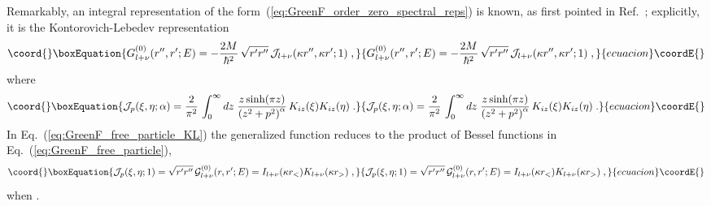 \documentclass[a4paper,preprint,draft,showpacs,amsmath,amsfonts,amssymb,aps,prd]{revtex4}%
\begin{document}
Remarkably,
an integral representation of the 
form~(\ref{eq:GreenF_order_zero_spectral_reps})
is known, as first pointed in Ref.~\cite{bha:89};
explicitly,
it is the Kontorovich-Lebedev representation~\cite{kontorovich}  
\begin{equation}\coord{}\boxEquation{
G^{(0)}_{l+\nu} (r'',r';E)    
=
 - \frac{2M}{\hbar^{2}} \,
\sqrt{ r'r''} \,
{\cal J}_{l+\nu} (\kappa r'',\kappa r';1)
\;   ,
\label{eq:GreenF_free_particle_KL}
}{
G^{(0)}_{l+\nu} (r'',r';E)    
=
 - \frac{2M}{\hbar^{2}} \,
\sqrt{ r'r''} \,
{\cal J}_{l+\nu} (\kappa r'',\kappa r';1)
\;   ,
}{ecuacion}\coordE{}\end{equation}
where
\begin{equation}\coord{}\boxEquation{
{\cal J}_{p} (\xi,\eta; \alpha)
=
\frac{2}{\pi^{2}}
\,
\int_{0}^{\infty}  
dz \; \frac{ z \sinh ( \pi z )}{ \left(z^{2} + p^{2} \right)^{\alpha} }
\,
K_{iz} (\xi) K_{iz} (\eta)
\;   .
\label{KL_integral}
}{
{\cal J}_{p} (\xi,\eta; \alpha)
=
\frac{2}{\pi^{2}}
\,
\int_{0}^{\infty}  
dz \; \frac{ z \sinh ( \pi z )}{ \left(z^{2} + p^{2} \right)^{\alpha} }
\,
K_{iz} (\xi) K_{iz} (\eta)
\;   .
}{ecuacion}\coordE{}\end{equation}
In Eq.~(\ref{eq:GreenF_free_particle_KL}) 
the generalized function
\coordHE{}
reduces to the product 
of Bessel functions in 
Eq.~(\ref{eq:GreenF_free_particle}),
\begin{equation}\coord{}\boxEquation{
{\cal J}_{p} (\xi,\eta; 1)
=
   \sqrt{r'r''}  \,
 {\mathcal G}^{(0)}_{l+\nu} (r,r';E) 
=
I_{l+\nu}( \kappa r_{<} ) K_{l+ \nu} (\kappa r_{>} )
\;  ,
}{
{\cal J}_{p} (\xi,\eta; 1)
=
   \sqrt{r'r''}  \,
 {\mathcal G}^{(0)}_{l+\nu} (r,r';E) 
=
I_{l+\nu}( \kappa r_{<} ) K_{l+ \nu} (\kappa r_{>} )
\;  ,
}{ecuacion}\coordE{}\end{equation}
 when \coordHE{}.
\end{document}
